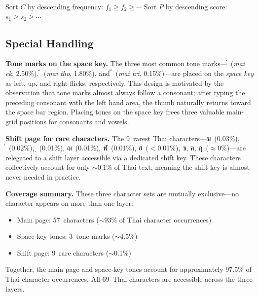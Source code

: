 \documentclass[10pt,twocolumn,a4paper]{article}
\newcommand{\thai}[1]{{\thaifont #1}}
\begin{document}
\begin{algorithm}[t]
\caption{Greedy Character Assignment}
\label{alg:greedy}
\SetAlgoLined
{}
Sort $C$ by descending frequency: $f_1 \geq f_2 \geq \cdots$\;
Sort $P$ by descending score: $s_1 \geq s_2 \geq \cdots$\;
\;
\end{algorithm}

\subsection{Special Handling}
\label{sec:design_special}

\textbf{Tone marks on the space key.}
The three most common tone marks---\thai{่}~(\emph{mai ek}, 2.50\%), \thai{้}~(\emph{mai tho}, 1.80\%), and \thai{๊}~(\emph{mai tri}, 0.15\%)---are placed on the \emph{space key} as left, up, and right flicks, respectively.
This design is motivated by the observation that tone marks almost always follow a consonant; after typing the preceding consonant with the left hand area, the thumb naturally returns toward the space bar region.
Placing tones on the space key frees three valuable main-grid positions for consonants and vowels.

\textbf{Shift page for rare characters.}
The 9~rarest Thai characters---\thai{ฆ}~(0.03\%), \thai{๋}~(0.02\%), \thai{ฺ}~(0.01\%), \thai{ฌ}~(0.01\%), \thai{ฬ}~(0.01\%), \thai{ฮ}~($<$0.01\%), \thai{ฃ}, \thai{ฅ}, \thai{ฦ}~($\approx$0\%)---are relegated to a shift layer accessible via a dedicated shift key.
These characters collectively account for only $\sim$0.1\% of Thai text, meaning the shift key is almost never needed in practice.

\textbf{Coverage summary.}
These three character sets are mutually exclusive---no character appears on more than one layer:
\begin{itemize}
  \item Main page: 57~characters ($\sim$93\% of Thai character occurrences)
  \item Space-key tones: 3~tone marks ($\sim$4.5\%)
  \item Shift page: 9~rare characters ($\sim$0.1\%)
\end{itemize}
Together, the main page and space-key tones account for approximately 97.5\% of Thai character occurrences.
All 69~Thai characters are accessible across the three layers.
\end{document}
